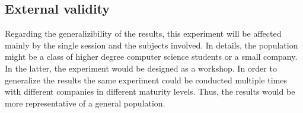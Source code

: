 \documentclass[runningheads]{llncs}
\begin{document}
\subsection{External validity}

Regarding the generalizibility of the results, this experiment will be affected mainly by the single session and the subjects involved. In details, the population might be a class of higher degree computer science students or a small company. In the latter, the experiment would be designed as a workshop. In order to generalize the results the same experiment could be conducted multiple times with different companies in different maturity levels. Thus, the results would be more representative of a general population.



%
%
%
% 
% 
%
\end{document}
